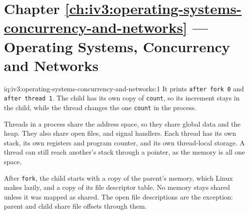\section*{Chapter \ref{ch:iv3:operating-systems-concurrency-and-networks} --- Operating Systems, Concurrency and Networks}

\begin{solution}{iq:iv3:operating-systems-concurrency-and-networks:1}
It prints \texttt{after fork 0} and \texttt{after thread 1}. The child has its own copy of \texttt{count}, so its increment stays in the child, while the thread changes the one \texttt{count} in the process.

Threads in a process share the address space, so they share global data and the heap. They also share open files, and signal handlers. Each thread has its own stack, its own registers and program counter, and its own thread-local storage. A thread can still reach another's stack through a pointer, as the memory is all one space.

After \texttt{fork}, the child starts with a copy of the parent's memory, which Linux makes lazily, and a copy of its file descriptor table. No memory stays shared unless it was mapped as shared. The open file descriptions are the exception: parent and child share file offsets through them.

\end{solution}

